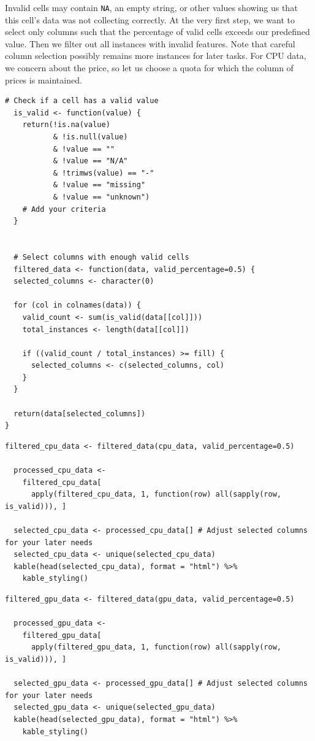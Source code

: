 Invalid cells may contain \texttt{NA}, an empty string, or other values showing us that this cell's data was not collecting correctly. At the very first step, we want to select only columns such that the percentage of valid cells exceeds our predefined value. Then we filter out all instances with invalid features. Note that careful column selection possibly remains more instances for later tasks. For CPU data, we concern about the price, so let us choose a quota for which the column of prices is maintained.

\begin{lstlisting}[caption={Cleaning functions}]
  # Check if a cell has a valid value
  is_valid <- function(value) {
    return(!is.na(value)
           & !is.null(value)
           & !value == ""
           & !value == "N/A"
           & !trimws(value) == "-"
           & !value == "missing"
           & !value == "unknown")
    # Add your criteria
  }
  
  
  # Select columns with enough valid cells
  filtered_data <- function(data, valid_percentage=0.5) {
  selected_columns <- character(0) 
  
  for (col in colnames(data)) { 
    valid_count <- sum(is_valid(data[[col]])) 
    total_instances <- length(data[[col]]) 
    
    if ((valid_count / total_instances) >= fill) {
      selected_columns <- c(selected_columns, col)
    }
  }
  
  return(data[selected_columns])
}
  \end{lstlisting}


\begin{lstlisting}[caption={Cleaned CPU data}]
  filtered_cpu_data <- filtered_data(cpu_data, valid_percentage=0.5)

  processed_cpu_data <- 
    filtered_cpu_data[
      apply(filtered_cpu_data, 1, function(row) all(sapply(row, is_valid))), ]
  
  selected_cpu_data <- processed_cpu_data[] # Adjust selected columns for your later needs
  selected_cpu_data <- unique(selected_cpu_data)
  kable(head(selected_cpu_data), format = "html") %>%
    kable_styling()
\end{lstlisting}

\begin{lstlisting}[caption={Cleaned GPU data}]
  filtered_gpu_data <- filtered_data(gpu_data, valid_percentage=0.5)

  processed_gpu_data <- 
    filtered_gpu_data[
      apply(filtered_gpu_data, 1, function(row) all(sapply(row, is_valid))), ]
  
  selected_gpu_data <- processed_gpu_data[] # Adjust selected columns for your later needs
  selected_gpu_data <- unique(selected_gpu_data)
  kable(head(selected_gpu_data), format = "html") %>%
    kable_styling()
\end{lstlisting}


